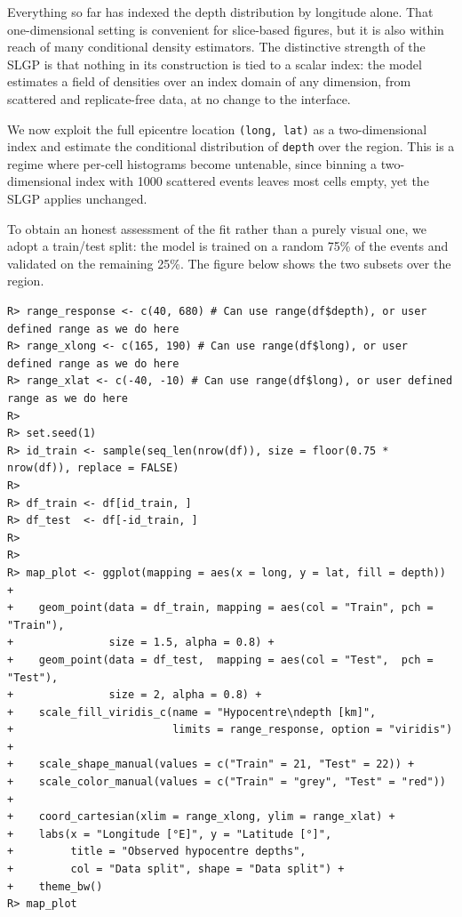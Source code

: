 \documentclass[
]{article}
\begin{document}
Everything so far has indexed the depth distribution by longitude alone. That one-dimensional setting is convenient for slice-based figures, but it is also within reach of many conditional density estimators. The distinctive strength of the SLGP is that nothing in its construction is tied to a scalar index: the model estimates a field of densities over an index domain of any dimension, from scattered and replicate-free data, at no change to the interface.

We now exploit the full epicentre location \texttt{(long,\ lat)} as a two-dimensional index and estimate
the conditional distribution of \texttt{depth} over the region. This is a regime where per-cell histograms become untenable, since binning a two-dimensional index with 1000 scattered events leaves most cells empty, yet the SLGP applies unchanged.

To obtain an honest assessment of the fit rather than a purely visual one, we adopt a train/test split: the model is trained on a random 75\% of the events and validated on the remaining 25\%. The figure below shows the two subsets over the region.

\begin{verbatim}
R> range_response <- c(40, 680) # Can use range(df$depth), or user defined range as we do here
R> range_xlong <- c(165, 190) # Can use range(df$long), or user defined range as we do here
R> range_xlat <- c(-40, -10) # Can use range(df$long), or user defined range as we do here
R> 
R> set.seed(1)
R> id_train <- sample(seq_len(nrow(df)), size = floor(0.75 * nrow(df)), replace = FALSE)
R> 
R> df_train <- df[id_train, ]
R> df_test  <- df[-id_train, ]
R> 
R> 
R> map_plot <- ggplot(mapping = aes(x = long, y = lat, fill = depth)) +
+    geom_point(data = df_train, mapping = aes(col = "Train", pch = "Train"),
+               size = 1.5, alpha = 0.8) +
+    geom_point(data = df_test,  mapping = aes(col = "Test",  pch = "Test"),
+               size = 2, alpha = 0.8) +
+    scale_fill_viridis_c(name = "Hypocentre\ndepth [km]",
+                         limits = range_response, option = "viridis") +
+    scale_shape_manual(values = c("Train" = 21, "Test" = 22)) +
+    scale_color_manual(values = c("Train" = "grey", "Test" = "red")) +
+    coord_cartesian(xlim = range_xlong, ylim = range_xlat) +
+    labs(x = "Longitude [°E]", y = "Latitude [°]",
+         title = "Observed hypocentre depths",
+         col = "Data split", shape = "Data split") +
+    theme_bw()
R> map_plot
\end{verbatim}
\end{document}
